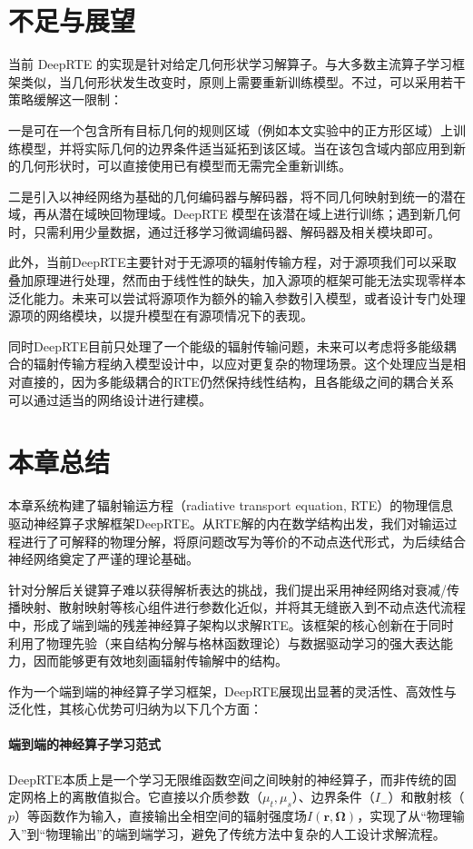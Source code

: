 \section{不足与展望}

当前 DeepRTE 的实现是针对给定几何形状学习解算子。与大多数主流算子学习框架类似，当几何形状发生改变时，原则上需要重新训练模型。不过，可以采用若干策略缓解这一限制：

一是可在一个包含所有目标几何的规则区域（例如本文实验中的正方形区域）上训练模型，并将实际几何的边界条件适当延拓到该区域。当在该包含域内部应用到新的几何形状时，可以直接使用已有模型而无需完全重新训练。

二是引入以神经网络为基础的几何编码器与解码器，将不同几何映射到统一的潜在域，再从潜在域映回物理域。DeepRTE 模型在该潜在域上进行训练；遇到新几何时，只需利用少量数据，通过迁移学习微调编码器、解码器及相关模块即可。

此外，当前DeepRTE主要针对于无源项的辐射传输方程，对于源项我们可以采取叠加原理进行处理，然而由于线性性的缺失，加入源项的框架可能无法实现零样本泛化能力。未来可以尝试将源项作为额外的输入参数引入模型，或者设计专门处理源项的网络模块，以提升模型在有源项情况下的表现。

同时DeepRTE目前只处理了一个能级的辐射传输问题，未来可以考虑将多能级耦合的辐射传输方程纳入模型设计中，以应对更复杂的物理场景。这个处理应当是相对直接的，因为多能级耦合的RTE仍然保持线性结构，且各能级之间的耦合关系可以通过适当的网络设计进行建模。

\section{本章总结}

本章系统构建了辐射输运方程（radiative transport equation, RTE）的物理信息驱动神经算子求解框架DeepRTE。从RTE解的内在数学结构出发，我们对输运过程进行了可解释的物理分解，将原问题改写为等价的不动点迭代形式，为后续结合神经网络奠定了严谨的理论基础。

针对分解后关键算子难以获得解析表达的挑战，我们提出采用神经网络对衰减/传播映射、散射映射等核心组件进行参数化近似，并将其无缝嵌入到不动点迭代流程中，形成了端到端的残差神经算子架构以求解RTE。该框架的核心创新在于同时利用了物理先验（来自结构分解与格林函数理论）与数据驱动学习的强大表达能力，因而能够更有效地刻画辐射传输解中的结构。

作为一个端到端的神经算子学习框架，DeepRTE展现出显著的灵活性、高效性与泛化性，其核心优势可归纳为以下几个方面：
\paragraph{端到端的神经算子学习范式}
DeepRTE本质上是一个学习无限维函数空间之间映射的神经算子，而非传统的固定网格上的离散值拟合。它直接以介质参数（$\mu_t, \mu_s$）、边界条件（$I_-$）和散射核（$p$）等函数作为输入，直接输出全相空间的辐射强度场$I(\boldsymbol{r},\boldsymbol{\Omega})$，实现了从“物理输入”到“物理输出”的端到端学习，避免了传统方法中复杂的人工设计求解流程。
